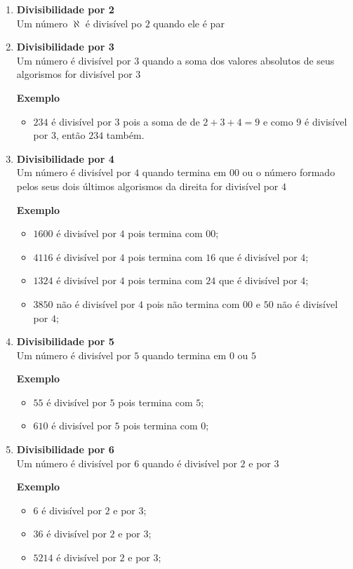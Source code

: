 \begin{enumerate}
	\item \textbf{Divisibilidade por 2} \\
	Um número \textbf{$\aleph$} é divisível po $2$ quando ele é par

\item \textbf{Divisibilidade por 3} \\
Um número é divisível por $3$ quando a soma dos valores absolutos de seus algorismos for divisível por $3$

\textbf{Exemplo}
	\begin{itemize}
		\item $234$ é divisível por $3$ pois a soma de de $2+3+4 = 9$ e como $9$ é divisível por $3$, então $234$ também. 
	\end{itemize} 

\item \textbf{Divisibilidade por 4} \\
Um número é divisível por $4$ quando termina em $00$ ou o número formado pelos seus dois últimos algorismos da direita for divisível por $4$

	\textbf{Exemplo}
	\begin{itemize}
		\item $1600$ é divisível por $4$ pois termina com $00$;
		\item $4116$ é divisível por $4$ pois termina com $16$ que é divisível por $4$;
		\item $1324$ é divisível por $4$ pois termina com $24$ que é divisível por $4$;
		\item $3850$ não é divisível por $4$ pois não termina com $00$ e $50$ não é divisível por $4$;
	\end{itemize}

\item \textbf{Divisibilidade por 5} \\
Um número é divisível por $5$ quando termina em $0$ ou $5$

\textbf{Exemplo}
\begin{itemize}
	\item $55$ é divisível por $5$ pois termina com $5$;
	\item $610$ é divisível por $5$ pois termina com $0$;
\end{itemize}

\item \textbf{Divisibilidade por 6} \\
Um número é divisível por $6$ quando é divisível por $2$ e por $3$

\textbf{Exemplo}
\begin{itemize}
	\item $6$ é divisível por $2$ e por $3$;
	\item $36$ é divisível por $2$ e por $3$;
	\item $5214$ é divisível por $2$ e por $3$;
\end{itemize}

\end{enumerate}

